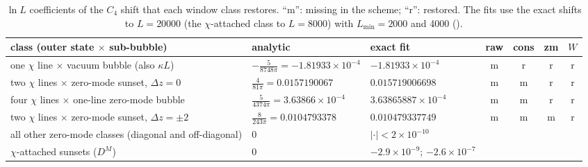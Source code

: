 \begin{table}[ht]
\centering\footnotesize\renewcommand{\arraystretch}{1.15}
\begin{tabular}{@{}p{4.9cm}p{2.9cm}p{2.6cm}cccc@{}}
\toprule
class (outer state $\times$ sub-bubble) & analytic & exact fit & raw & cons & zm & $W$ \\\midrule
one $\chi$ line $\times$ vacuum bubble (also $\kappa L$) & $-\frac5{8748\pi}=-1.81933\times10^{-4}$ & $-1.81933\times10^{-4}$ & m & r & r & r \\
two $\chi$ lines $\times$ zero-mode sunset, $\Delta z=0$ & $\frac4{81\pi}=0.0157190067$ & $0.015719006698$ & m & m & r & r \\
four $\chi$ lines $\times$ one-line zero-mode bubble & $\frac5{4374\pi}=3.63866\times10^{-4}$ & $3.63865887\times10^{-4}$ & m & m & r & r \\
two $\chi$ lines $\times$ zero-mode sunset, $\Delta z=\pm2$ & $\frac8{243\pi}=0.0104793378$ & $0.010479337749$ & m & m & m & r \\
all other zero-mode classes (diagonal and off-diagonal) & 0 & $|\cdot|<2\times10^{-10}$ & & & & \\
$\chi$-attached sunsets ($D^M$) & 0 & $-2.9\times10^{-9}$; $-2.6\times10^{-7}$ & & & & \\
\bottomrule
\end{tabular}
\caption{$\ln L$ coefficients of the $C_4$ shift that each window class restores. ``m'': missing in the scheme; ``r'':
restored. The fits use the exact shifts to $L=20000$ (the $\chi$-attached class to $L=8000$) with $L_{\min}=2000$ and 4000
().}
\label{htp:d2:tab:logs}
\end{table}

